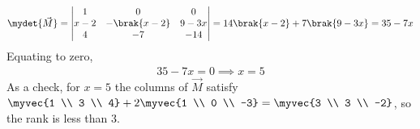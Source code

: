 \begin{enumerate}[label=\thesubsection.\arabic*, ref=\thesubsection.\theenumi]
\begin{align}
	\mydet{\vec{M}} = \begin{vmatrix}
		1 & 0 & 0 \\
		x - 2 & -\brak{x - 2} & 9 - 3x \\
		4 & -7 & -14
	\end{vmatrix}
	= 14\brak{x - 2} + 7\brak{9 - 3x} = 35 - 7x
\end{align}
Equating to zero,
\begin{align}
	35 - 7x = 0 \implies x = 5
\end{align}
As a check, for $x = 5$ the columns of $\vec{M}$ satisfy $\myvec{1 \\ 3 \\ 4} + 2\myvec{1 \\ 0 \\ -3} = \myvec{3 \\ 3 \\ -2}$, so the rank is less than $3$.


\end{enumerate}
